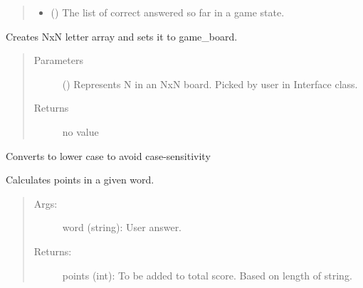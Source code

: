 \documentclass[letterpaper,10pt,english]{sphinxmanual}
\begin{document}
\begin{fulllineitems}
\begin{quote}
\begin{description}
\begin{itemize}
\item {} 
 () \textendash{} The list of correct answered so far in a game state.

\end{itemize}

\end{description}\end{quote}


\begin{fulllineitems}
Creates NxN letter array and sets it to game\_board.
\begin{quote}\begin{description}
\item[{Parameters}] \leavevmode
{} () \textendash{} Represents N in an NxN board. Picked by user in Interface class.

\item[{Returns}] \leavevmode
no value

\end{description}\end{quote}

\end{fulllineitems}



\begin{fulllineitems}
Converts to lower case to avoid case-sensitivity

\end{fulllineitems}



\begin{fulllineitems}
Calculates points in a given word.
\begin{quote}
\begin{description}
\item[{Args:}] \leavevmode
word (string): User answer.

\item[{Returns:}] \leavevmode
points (int): To be added to total score. Based on length of string.

\end{description}
\end{quote}


\end{fulllineitems}
\end{fulllineitems}
\end{document}
